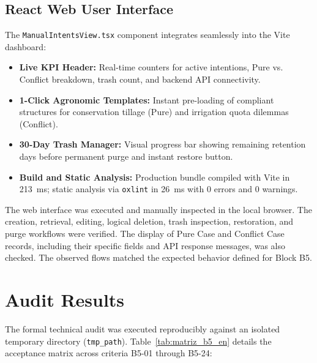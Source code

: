 \documentclass[11pt,a4paper]{article}
\begin{document}
\subsection{React Web User Interface}
The \texttt{ManualIntentsView.tsx} component integrates seamlessly into the Vite dashboard:
\begin{itemize}[itemsep=2pt]
    \item \textbf{Live KPI Header:} Real-time counters for active intentions, Pure vs. Conflict breakdown, trash count, and backend API connectivity.
    \item \textbf{1-Click Agronomic Templates:} Instant pre-loading of compliant structures for conservation tillage (Pure) and irrigation quota dilemmas (Conflict).
    \item \textbf{30-Day Trash Manager:} Visual progress bar showing remaining retention days before permanent purge and instant restore button.
    \item \textbf{Build and Static Analysis:} Production bundle compiled with Vite in 213~ms; static analysis via \texttt{oxlint} in 26~ms with 0 errors and 0 warnings.
\end{itemize}

The web interface was executed and manually inspected in the local browser. The creation, retrieval, editing, logical deletion, trash inspection, restoration, and purge workflows were verified. The display of Pure Case and Conflict Case records, including their specific fields and API response messages, was also checked. The observed flows matched the expected behavior defined for Block B5.

\section{Audit Results}

The formal technical audit was executed reproducibly against an isolated temporary directory (\texttt{tmp\_path}). Table~\ref{tab:matriz_b5_en} details the acceptance matrix across criteria B5-01 through B5-24:
\end{document}
